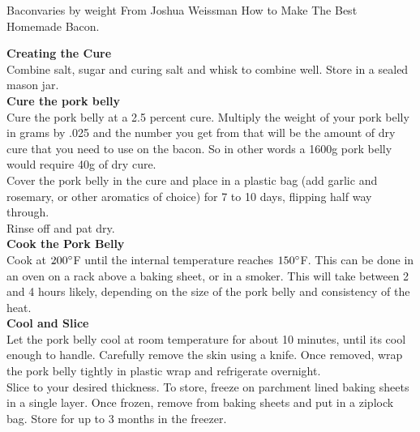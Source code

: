 \begin{recipe}{Bacon}{varies by weight}{}
    \freeform From Joshua Weissman How to Make The Best Homemade Bacon.


    \textbf{Creating the Cure}\\
    Combine salt, sugar and curing salt and whisk to combine well. Store in a sealed mason jar.\\

    \textbf{Cure the pork belly}\\
    Cure the pork belly at a 2.5 percent cure. Multiply the weight of your pork belly in grams by .025 and the number you get from that will be the amount of dry cure that you need to use on the bacon. So in other words a 1600g pork belly would require 40g of dry cure.\\

    Cover the pork belly in the cure and place in a plastic bag (add garlic and rosemary, or other aromatics of choice) for 7 to 10 days, flipping half way through.\\

    Rinse off and pat dry.\\

    \textbf{Cook the Pork Belly}\\

    Cook at $200\degree$F until the internal temperature reaches $150\degree$F. This can be done in an oven on a rack above a baking sheet, or in a smoker. This will take between 2 and 4 hours likely, depending on the size of the pork belly and consistency of the heat.\\

    \textbf{Cool and Slice}\\

    Let the pork belly cool at room temperature for about 10 minutes, until its cool enough to handle. Carefully remove the skin using a knife. Once removed, wrap the pork belly tightly in plastic wrap and refrigerate overnight.\\

    Slice to your desired thickness. To store, freeze on parchment lined baking sheets in a single layer. Once frozen, remove from baking sheets and put in a ziplock bag. Store for up to 3 months in the freezer.

\end{recipe}